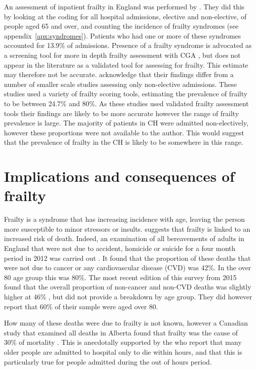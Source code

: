 \documentclass
[
	12pt,
	a4paper,
	oneside,
]{report}
\begin{document}
An assessment of inpatient frailty in England was performed by \textcite{soong:15}.
They did this by looking at the coding for all hospital admissions, elective
and non-elective, of people
aged 65 and over, and counting 
the incidence of frailty syndromes (see appendix~\ref{apx:syndromes}). 
Patients who had one or more of these syndromes accounted for 13.9\% of 
admissions. Presence of a frailty
syndrome is advocated as a screening tool for more in depth frailty assessment 
with CGA \parencite{silver:12}, but does not appear in the literature as a 
validated tool for assessing for frailty. This estimate may therefore not be 
accurate. \textcite{soong:15} acknowledge that their findings differ from 
a number of smaller scale studies assessing only non-elective admissions. These
studies used a variety of frailty scoring tools, estimating the prevalence of 
frailty to be between 24.7\% and 80\%. As these studies used validated frailty
assessment tools their findings are likely to be more accurate however the 
range of frailty prevalence is large. The majority of patients in CH were 
admitted non-electively, however these proportions were not available to the
author. This would suggest that the prevalence of frailty in the CH is likely
to be somewhere in this range.

\section{Implications and consequences of frailty}

\label{sec:frailty-implications}
Frailty is a syndrome that has increasing incidence with age, leaving the person
more susceptible to minor stressors or insults. \textcite{collard:12} suggests
that frailty is linked to an increased risk of death. Indeed,
an examination
of all bereavements of adults in England that were not due to accident, homicide or suicide for 
a four month period in 2012 was 
carried out \parencite{ons:13}. It found that the proportion of these deaths
that were not due to cancer or any cardiovascular disease (CVD) was 42\%. 
In the over 80
age group this was 80\%. The most recent edition of this survey from 2015 found
that the overall proportion of non-cancer and non-CVD deaths was slightly higher 
at 46\% \parencite{ons:16}, but did not provide a breakdown by age group. They 
did however report that 60\% of their sample were aged over 80.

How many of these deaths were due to frailty is not known, however 
a Canadian study that examined all deaths in Alberta found that frailty was the
cause of 30\% of mortality \parencite{fassbender:09}. This is anecdotally
supported by the \textcite{silver:12} who report that many older people are 
admitted to hospital only to die within hours, and that
this is particularly true for people admitted during the out of hours period.
\end{document}
